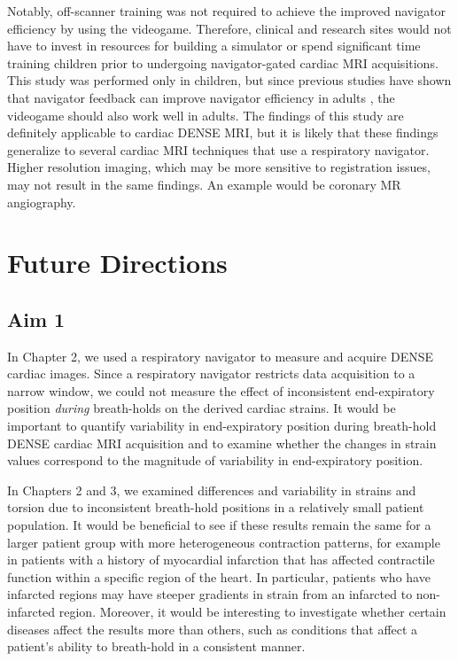 	Notably, off-scanner training was not required to achieve the improved navigator efficiency by using the videogame. Therefore, clinical and research sites would not have to invest in resources for building a simulator or spend significant time training children prior to undergoing navigator-gated cardiac MRI acquisitions. This study was performed only in children, but since previous studies have shown that navigator feedback can improve navigator efficiency in adults \cite{Feuerlein2009,Liu1993}, the videogame should also work well in adults. The findings of this study are definitely applicable to cardiac DENSE MRI, but it is likely that these findings generalize to several cardiac MRI techniques that use a respiratory navigator. Higher resolution imaging, which may be more sensitive to registration issues, may not result in the same findings. An example would be coronary MR angiography.

\section{Future Directions}

\subsection{Aim 1}
	In Chapter 2, we used a respiratory navigator to measure and acquire DENSE cardiac images. Since a respiratory navigator restricts data acquisition to a narrow window, we could not measure the effect of inconsistent end-expiratory position \textit{during} breath-holds on the derived cardiac strains. It would be important to quantify variability in end-expiratory position during breath-hold DENSE cardiac MRI acquisition and to examine whether the changes in strain values correspond to the magnitude of variability in end-expiratory position.
	
	In Chapters 2 and 3, we examined differences and variability in strains and torsion due to inconsistent breath-hold positions in a relatively small patient population. It would be beneficial to see if these results remain the same for a larger patient group with more heterogeneous contraction patterns, for example in patients with a history of myocardial infarction that has affected contractile function within a specific region of the heart. In particular, patients who have infarcted regions may have steeper gradients in strain from an infarcted to non-infarcted region. Moreover, it would be interesting to investigate whether certain diseases affect the results more than others, such as conditions that affect a patient's ability to breath-hold in a consistent manner.

